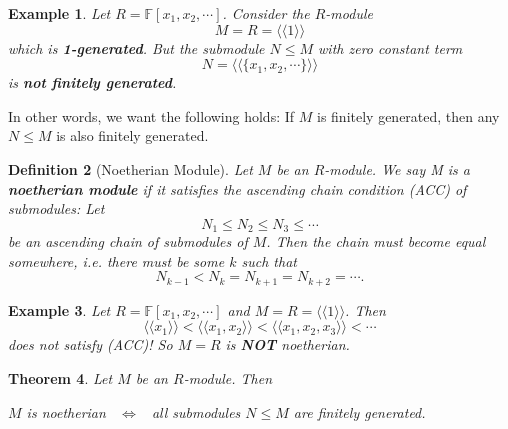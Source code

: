 \documentclass[12pt]{amsbook}
\newtheorem{theorem}{Theorem}[section]
\newtheorem{definition}[theorem]{Definition}
\newtheorem{example}[theorem]{Example}
\begin{document}
\begin{example}
Let $R=\mathbb{F}[x_1,x_2,\cdots]$. Consider the $R$-module
$$M=R=\langle\langle1\rangle\rangle$$ 
which is {\bf 1-generated}. But the submodule $N\leq M$ with zero constant term 
$$N=\langle\langle\{x_1,x_2,\cdots\}\rangle\rangle$$ 
is {\bf not finitely generated}.
\end{example}

In other words, we want the following holds: If $M$ is finitely generated, then any $N\leq M$ is also finitely generated.

\begin{definition} [Noetherian Module]
 Let $M$ be an $R$-module. We say M is a {\bf noetherian module} if it satisfies the ascending chain condition (ACC) of submodules: Let 
 $$N_1\leq N_2\leq N_3\leq\cdots$$ 
 be an ascending chain of submodules of $M$. Then the chain must become equal somewhere, i.e. there must be some $k$ such that 
 $$N_{k-1}<N_k=N_{k+1}= N_{k+2} = \cdots.$$
\end{definition}

\begin{example}
    Let $R=\mathbb{F}[x_1,x_2,\cdots]$ and $M=R=\langle\langle1\rangle\rangle$. Then
    $$\langle\langle x_1\rangle\rangle < \langle\langle x_1,x_2\rangle\rangle<\langle\langle x_1, x_2, x_3\rangle\rangle<\cdots$$
    does not satisfy (ACC)! So $M=R$ is {\bf NOT} noetherian.
\end{example}

\begin{theorem}
    Let $M$ be an $R$-module. Then 
    \begin{center}
        $M$ is noetherian \ $\Leftrightarrow$ \ all submodules $N\leq M$ are finitely generated.
    \end{center}
\end{theorem}
\end{document}
